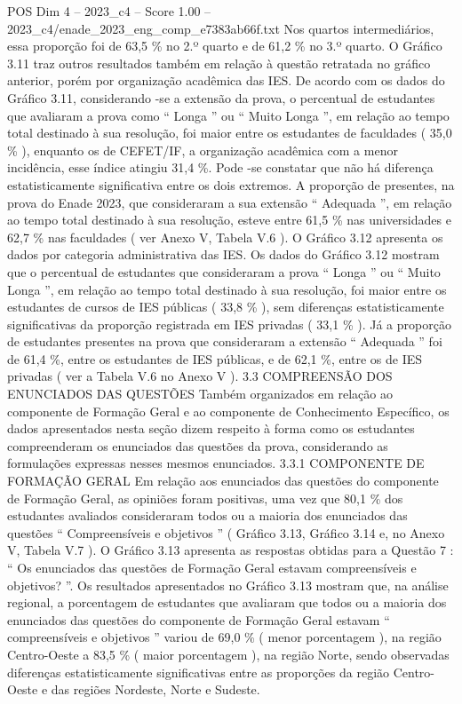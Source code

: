 \begin{textsample}{POS Dim 4 – 2023\_c4 – Score 1.00 – 2023\_c4/enade\_2023\_eng\_comp\_e7383ab66f.txt}
Nos quartos intermediários, essa proporção foi de 63,5 \% no 2.º quarto e de 61,2 \% no 3.º quarto.
O Gráfico 3.11 traz outros resultados também em relação à questão retratada no gráfico anterior, porém por organização acadêmica das IES.
De acordo com os dados do Gráfico 3.11, considerando -se a extensão da prova, o percentual de estudantes que avaliaram a prova como “ Longa ” ou “ Muito Longa ”, em relação ao tempo total destinado à sua resolução, foi maior entre os estudantes de faculdades ( 35,0 \% ), enquanto os de CEFET/IF, a organização acadêmica com a menor incidência, esse índice atingiu 31,4 \%.
Pode -se constatar que não há diferença estatisticamente significativa entre os dois extremos.
A proporção de presentes, na prova do Enade 2023, que consideraram a sua extensão “ Adequada ”, em relação ao tempo total destinado à sua resolução, esteve entre 61,5 \% nas universidades e 62,7 \% nas faculdades ( ver Anexo V, Tabela V.6 ).
O Gráfico 3.12 apresenta os dados por categoria administrativa das IES.
Os dados do Gráfico 3.12 mostram que o percentual de estudantes que consideraram a prova “ Longa ” ou “ Muito Longa ”, em relação ao tempo total destinado à sua resolução, foi maior entre os estudantes de cursos de IES públicas ( 33,8 \% ), sem diferenças estatisticamente significativas da proporção registrada em IES privadas ( 33,1 \% ).
Já a proporção de estudantes presentes na prova que consideraram a extensão “ Adequada ” foi de 61,4 \%, entre os estudantes de IES públicas, e de 62,1 \%, entre os de IES privadas ( ver a Tabela V.6 no Anexo V ). 3.3 COMPREENSÃO DOS ENUNCIADOS DAS QUESTÕES Também organizados em relação ao componente de Formação Geral e ao componente de Conhecimento Específico, os dados apresentados nesta seção dizem respeito à forma como os estudantes compreenderam os enunciados das questões da prova, considerando as formulações expressas nesses mesmos enunciados. 3.3.1 COMPONENTE DE FORMAÇÃO GERAL Em relação aos enunciados das questões do componente de Formação Geral, as opiniões foram positivas, uma vez que 80,1 \% dos estudantes avaliados consideraram todos ou a maioria dos enunciados das questões “ Compreensíveis e objetivos ” ( Gráfico 3.13, Gráfico 3.14 e, no Anexo V, Tabela V.7 ).
O Gráfico 3.13 apresenta as respostas obtidas para a Questão 7 : “ Os enunciados das questões de Formação Geral estavam compreensíveis e objetivos? ”.
Os resultados apresentados no Gráfico 3.13 mostram que, na análise regional, a porcentagem de estudantes que avaliaram que todos ou a maioria dos enunciados das questões do componente de Formação Geral estavam “ compreensíveis e objetivos ” variou de 69,0 \% ( menor porcentagem ), na região Centro-Oeste a 83,5 \% ( maior porcentagem ), na região Norte, sendo observadas diferenças estatisticamente significativas entre as proporções da região Centro-Oeste e das regiões Nordeste, Norte e Sudeste.

\end{textsample}
